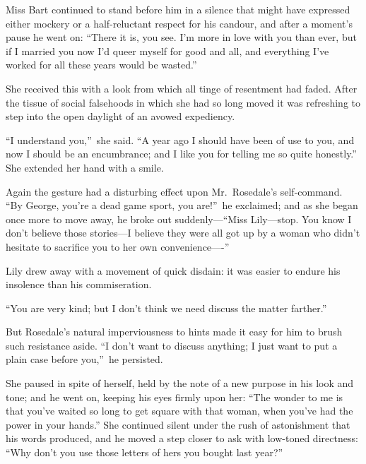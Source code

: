 \documentclass[12pt,a4paper]{book}
\begin{document}
Miss Bart continued to stand before him in a silence that might
have expressed either mockery or a half-reluctant respect for his
candour, and after a moment's pause he went on: ``There it is, you
see. I'm more in love with you than ever, but if I married you
now I'd queer myself for good and all, and everything I've worked
for all these years would be wasted.''





She received this with a look from which all tinge of resentment
had faded. After the tissue of social falsehoods in which she had
so long moved it was refreshing to step into the open daylight of
an avowed expediency.





``I understand you,''\ she said. ``A year ago I should have been of
use to you, and now I should be an encumbrance; and I like you
for telling me so quite honestly.'' She extended her hand with a
smile.





Again the gesture had a disturbing effect upon Mr.\ Rosedale's
self-command. ``By George, you're a dead game sport, you are!''\ he
exclaimed; and as she began once more to move away, he broke out
suddenly---``Miss Lily---stop. You know I don't believe those
stories---I believe they were all got up by a woman who didn't
hesitate to sacrifice you to her own convenience----''





Lily drew away with a movement of quick disdain: it was easier to
endure his insolence than his commiseration.





``You are very kind; but I don't think we need discuss the matter
farther.''





But Rosedale's natural imperviousness to hints made it easy for
him to brush such resistance aside. ``I don't want to discuss
anything; I just want to put a plain case before you,''\ he
persisted.





She paused in spite of herself, held by the note of a new purpose
in his look and tone; and he went on, keeping his eyes firmly
upon her: ``The wonder to me is that you've waited so long to get
square with that woman, when you've had the power in your hands.'' 
She continued silent under the rush of astonishment that his
words produced, and he moved a step closer to ask with low-toned
directness: ``Why don't you use those letters of hers you bought
last year?''
\end{document}

